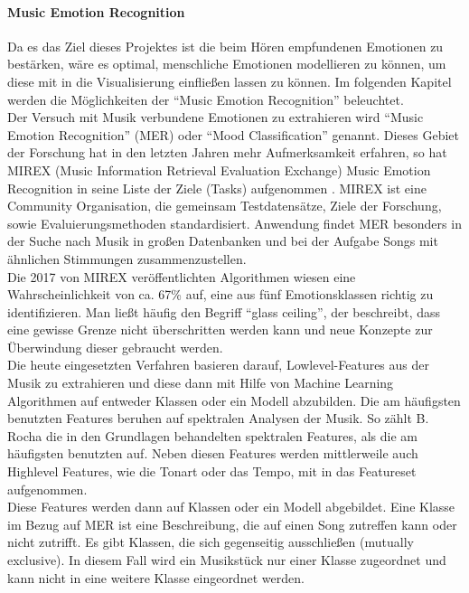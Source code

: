 \documentclass[11pt,a4paper]{article}
\begin{document}
\paragraph{Music Emotion Recognition}
Da es das Ziel dieses Projektes ist die beim Hören empfundenen Emotionen zu bestärken, wäre es optimal, menschliche Emotionen modellieren zu können, um diese mit in die Visualisierung einfließen lassen zu können. Im folgenden Kapitel werden die Möglichkeiten der ``Music Emotion Recognition'' beleuchtet.\\
Der Versuch mit Musik verbundene Emotionen zu extrahieren wird ``Music Emotion Recognition'' (MER) oder ``Mood Classification'' genannt. Dieses Gebiet der Forschung hat in den letzten Jahren mehr Aufmerksamkeit erfahren, so hat MIREX (Music Information Retrieval Evaluation Exchange) Music Emotion Recognition in seine Liste der Ziele (Tasks) aufgenommen \cite{dadf933477b66ec1591840023fc37ac83b3e10d5aa4fd440639abca907d805ba}. MIREX ist eine Community Organisation, die gemeinsam Testdatensätze, Ziele der Forschung, sowie Evaluierungsmethoden standardisiert.
Anwendung findet MER besonders in der Suche nach Musik in großen Datenbanken und bei der Aufgabe Songs mit ähnlichen Stimmungen zusammenzustellen.\\
Die 2017 von MIREX veröffentlichten Algorithmen wiesen eine Wahrscheinlichkeit von ca. 67\% auf, eine aus fünf Emotionsklassen richtig zu identifizieren\cite{mirex_results_2017}. Man ließt häufig den Begriff ``glass ceiling'', der beschreibt, dass eine gewisse Grenze nicht überschritten werden kann und neue Konzepte zur Überwindung dieser gebraucht werden.\\
Die heute eingesetzten Verfahren basieren darauf, Lowlevel-Features aus der Musik zu extrahieren und diese dann mit Hilfe von Machine Learning Algorithmen auf entweder Klassen oder ein Modell abzubilden. Die am häufigsten benutzten Features beruhen auf spektralen Analysen der Musik. So zählt B. Rocha \cite{43334da08db3748e0a566e71fbb76d92cf6f15f35575908aa975b0b2baddab5b} die in den Grundlagen behandelten spektralen Features, als die am häufigsten benutzten auf. Neben diesen Features werden mittlerweile auch Highlevel Features, wie die Tonart oder das Tempo, mit in das Featureset aufgenommen.\\
Diese Features werden dann auf Klassen oder ein Modell abgebildet. Eine Klasse im Bezug auf MER ist eine Beschreibung, die auf einen Song zutreffen kann oder nicht zutrifft. Es gibt Klassen, die sich gegenseitig ausschließen (mutually exclusive). In diesem Fall wird ein Musikstück nur einer Klasse zugeordnet und kann nicht in eine weitere Klasse eingeordnet werden.\\
\end{document}
